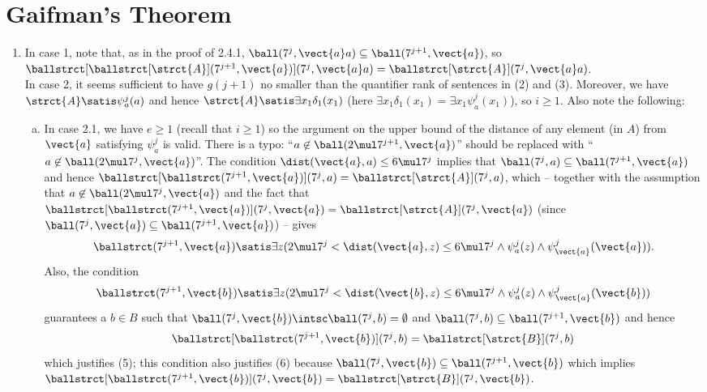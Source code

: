 \section{Gaifman's Theorem}
\begin{enumerate}[1.]
%
\item {} In case 1, note that, as in the proof of 2.4.1, $\ball(7^j, \vect{a}a) \subseteq \ball(7^{j + 1}, \vect{a})$, so $\ballstrct[{\ballstrct[\strct{A}](7^{j + 1}, \vect{a})}](7^j, \vect{a}a) = \ballstrct[\strct{A}](7^j, \vect{a}a)$.
\medskip\\
In case 2, it seems sufficient to have $g(j + 1)$ no smaller than the quantifier rank of sentences in (2) and (3). Moreover, we have $\strct{A} \satis \psi^j_a(a)$ and hence $\strct{A} \satis \exists x_1 \delta_1(x_1)$ (here $\exists x_1 \delta_1(x_1) = \exists x_1 \psi^j_a(x_1)$), so $i \geq 1$. Also note the following:
\begin{enumerate}[(a)]
\item In case 2.1, we have $e \geq 1$ (recall that $i \geq 1$) so the argument on the upper bound of the distance of any element (in $A$) from $\vect{a}$ satisfying $\psi^j_a$ is valid. There is a typo: ``$a \not\in \ball(2 \mul 7^{j + 1}, \vect{a})$'' should be replaced with ``$a \not\in \ball(2 \mul 7^j, \vect{a})$''. The condition $\dist(\vect{a}, a) \leq 6 \mul 7^j$ implies that $\ball(7^j, a) \subseteq \ball(7^{j + 1}, \vect{a})$ and hence $\ballstrct[\ballstrct(7^{j + 1}, \vect{a})](7^j, a) = \ballstrct[\strct{A}](7^j, a)$, which -- together with the assumption that $a \not\in \ball(2 \mul 7^j, \vect{a})$ and the fact that $\ballstrct[\ballstrct(7^{j + 1}, \vect{a})](7^j, \vect{a}) = \ballstrct[\strct{A}](7^j, \vect{a})$ (since $\ball(7^j, \vect{a}) \subseteq \ball(7^{j + 1}, \vect{a})$) -- gives
\[
\ballstrct(7^{j + 1}, \vect{a}) \satis \exists z (2 \mul 7^j < \dist(\vect{a}, z) \leq 6 \mul 7^j \land \psi^j_a(z) \land \psi^j_{\vect{a}}(\vect{a})).
\]
Also, the condition
\[
\ballstrct(7^{j + 1}, \vect{b}) \satis \exists z (2 \mul 7^j < \dist(\vect{b}, z) \leq 6 \mul 7^j \land \psi^j_a(z) \land \psi^j_{\vect{a}}(\vect{b}))
\]
guarantees a $b \in B$ such that $\ball(7^j, \vect{b}) \intsc \ball(7^j, b) = \emptyset$ and $\ball(7^j, b) \subseteq \ball(7^{j + 1}, \vect{b})$ and hence
\[
\ballstrct[\ballstrct(7^{j + 1}, \vect{b})](7^j, b) = \ballstrct[\strct{B}](7^j, b)
\]
which justifies (5); this condition also justifies (6) because $\ball(7^j, \vect{b}) \subseteq \ball(7^{j + 1}, \vect{b})$ which implies $\ballstrct[\ballstrct(7^{j + 1}, \vect{b})](7^j, \vect{b}) = \ballstrct[\strct{B}](7^j, \vect{b})$.

\end{enumerate}
\end{enumerate}
